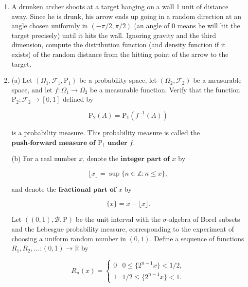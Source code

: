 \documentclass[11pt]{report}
\newcommand{\fitwidth}[1]{%
  \sbox\fitbox{#1}%
  \ifdim\wd\fitbox>\linewidth\resizebox{\linewidth}{!}{\usebox\fitbox}\else\usebox\fitbox\fi}
\providecommand{\cal}{\mathcal}
\newcommand{\R}{\mathbb{R}}
\newcommand{\Z}{\mathbb{Z}}
\theoremstyle{plain}
\theoremstyle{definition}
\begin{document}
\begin{enumerate}[label=\arabic*.]
Compute the lower and upper quantile functions of
$F$, defined by

\begin{center}
\fitwidth{$\displaystyle
\begin{array}{ccc} X_*(p) &=& \sup \{ x : F(x) < p \}, \\
X^*(p) &=& \inf \{ x : F(x) > p \},
\end{array} \qquad\qquad (0<p<1).
$}
\end{center}

A recommended way is to plot $F$ on paper and then
figure out the quantiles by ``eyeballing''. Of course,
the answer should be spelled out in precise formulas.

\item A drunken archer shoots at a target hanging on a wall
1 unit of distance away. Since he is drunk, his arrow
ends up going in a random direction at an angle chosen
uniformly in $(-\pi/2,\pi/2)$ (an angle of $0$ means
he will hit the target precisely) until it hits the
wall. Ignoring gravity and the third dimension,
compute the distribution function (and density
function if it exists) of the random distance from the
hitting point of the arrow to the target.

\item (a) Let $(\Omega_1, {\cal F}_1, \mathrm{P}_1)$ be a
probability space, let $(\Omega_2, {\cal F}_2)$ be a
measurable space, and let $f:\Omega_1\to\Omega_2$ be
a measurable function. Verify that the function
$\mathrm{P}_2:{\cal F}_2\to [0,1]$ defined by

\[
\mathrm{P}_2(A) = \mathrm{P}_1(f^{-1}(A))
\]

is a probability measure. This probability measure
is called the
$\textbf{push-forward measure of } \mathrm{P}_1
\textbf{ under } f$.

(b) For a real number $x$, denote the
$\textbf{integer part of } x$ by

\[
\lfloor x \rfloor = \sup \{ n \in \Z : n \le x \},
\]

and denote the $\textbf{fractional part of } x$ by

\[
\{ x \} = x - \lfloor x \rfloor.
\]

Let $((0,1), {\cal B}, \mathrm{P})$ be the unit
interval with the $\sigma$-algebra of Borel subsets
and the Lebesgue probability measure, corresponding to
the experiment of choosing a uniform random number in
$(0,1)$. Define a sequence of functions
$R_1, R_2, \ldots : (0,1) \to \R$ by

\[
R_n(x) = \begin{cases} 0 & 0 \le \{ 2^{n-1} x \} < 1/2, \\ 1 &
1/2 \le \{ 2^{n-1} x \} < 1. \end{cases}
\]


\end{enumerate}
\end{document}
